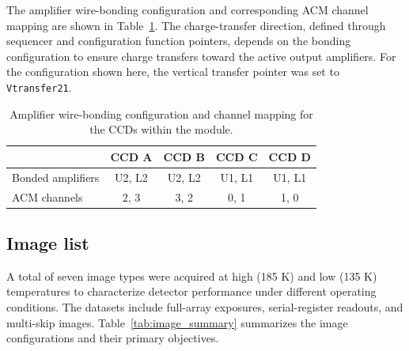 \documentclass[11pt]{article}
\begin{document}
The amplifier wire-bonding configuration and corresponding ACM channel mapping are shown in Table~\ref{tab:amp_mapping}. The charge-transfer direction, defined through sequencer and configuration function pointers, depends on the bonding configuration to ensure charge transfers toward the active output amplifiers. For the configuration shown here, the vertical transfer pointer was set to \texttt{Vtransfer21}.

\begin{table}[H]
\centering
\caption{Amplifier wire-bonding configuration and channel mapping for the CCDs within the module.}
\label{tab:amp_mapping}
\begin{tabular}{@{}lcccc@{}}
\toprule
 & \textbf{CCD A} & \textbf{CCD B} & \textbf{CCD C} & \textbf{CCD D} \\
\midrule
Bonded amplifiers & U2, L2 & U2, L2 & U1, L1 & U1, L1 \\
ACM channels      & 2, 3   & 3, 2   & 0, 1   & 1, 0   \\
\bottomrule
\end{tabular}
\end{table}


\subsection{Image list}
A total of seven image types were acquired at high (185 K) and low (135 K) temperatures to characterize detector performance under different operating conditions. The datasets include full-array exposures, serial-register readouts, and multi-skip images. Table~\ref{tab:image_summary} summarizes the image configurations and their primary objectives.
\end{document}
